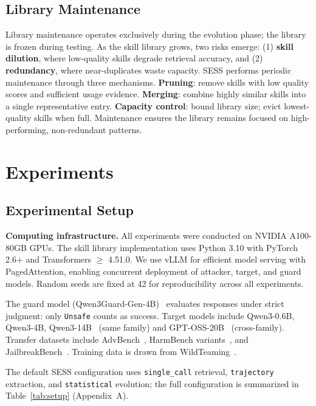 \documentclass{article} %
\begin{document}
\subsection{Library Maintenance}

Library maintenance operates exclusively during the evolution phase; the library is frozen during testing. As the skill library grows, two risks emerge: (1) \textbf{skill dilution}, where low-quality skills degrade retrieval accuracy, and (2) \textbf{redundancy}, where near-duplicates waste capacity. SESS performs periodic maintenance through three mechanisms. \textbf{Pruning}: remove skills with low quality scores and sufficient usage evidence. \textbf{Merging}: combine highly similar skills into a single representative entry. \textbf{Capacity control}: bound library size; evict lowest-quality skills when full. Maintenance ensures the library remains focused on high-performing, non-redundant patterns.

\section{Experiments}

\subsection{Experimental Setup}

\textbf{Computing infrastructure.} All experiments were conducted on NVIDIA A100-80GB GPUs. The skill library implementation uses Python 3.10 with PyTorch 2.6+ and Transformers $\geq$ 4.51.0. We use vLLM for efficient model serving with PagedAttention, enabling concurrent deployment of attacker, target, and guard models. Random seeds are fixed at 42 for reproducibility across all experiments.

The guard model (Qwen3Guard-Gen-4B)~\citep{qwen2025qwen3guard} evaluates responses under strict judgment: only \texttt{Unsafe} counts as success. Target models include Qwen3-0.6B, Qwen3-4B, Qwen3-14B~\citep{yang2025qwen3} (same family) and GPT-OSS-20B~\citep{openai2025gptoss} (cross-family). Transfer datasets include AdvBench~\citep{zou2023universal}, HarmBench variants~\citep{chao2024harmbench}, and JailbreakBench~\citep{caswell2024jailbreakbench}. Training data is drawn from WildTeaming~\citep{wildteaming2024}.

The default SESS configuration uses \texttt{single\_call} retrieval, \texttt{trajectory} extraction, and \texttt{statistical} evolution; the full configuration is summarized in Table~\ref{tab:setup} (Appendix~A).
\end{document}
